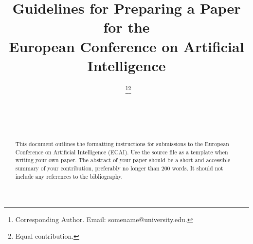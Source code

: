 \documentclass{ecai}
\begin{document}

\begin{frontmatter}




\title{Guidelines for Preparing a Paper for the \\
European Conference on Artificial Intelligence}


\author[A]{~\thanks{Corresponding Author. Email: somename@university.edu.}\footnote{Equal contribution.}}
\author[B]{~\footnotemark}
\author[B,C]{~} 

\address[A]{Short Affiliation of First Author}
\address[B]{Short Affiliation of Second Author and Third Author}
\address[C]{Short Alternate Affiliation of Third Author}


\begin{abstract}
This document outlines the formatting instructions for submissions to 
the European Conference on Artificial Intelligence (ECAI). 
Use the source file as a template when writing your own paper. 
The abstract of your paper should be a short and accessible summary 
of your contribution, preferably no longer than 200 words. 
It should not include any references to the bibliography.
\end{abstract}

\end{frontmatter}
\end{document}

